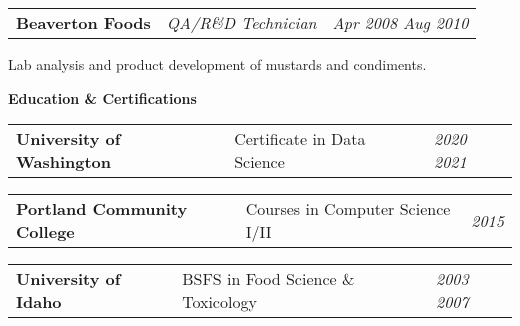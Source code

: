 \documentclass[letterpaper,12pt]{article}[leftmargin=*]
\newcommand{\education}[2]{\vspace{6pt}
  \colorbox{Copper}{\color{white}#1\hspace{9pt}\raggedbottom\normalsize\textbf{#2\hspace{4pt}}}
}
\newcommand{\resumeSectionStart}{\begin{itemize}[leftmargin=0.1in]}
\newcommand{\resumeSectionEnd}{\end{itemize}}
\newcommand{\resumeExperience}[3]{
  \vspace{-6pt}
  \item[]
    \begin{tabularx}{0.97\textwidth}{>{\raggedright}X >{\raggedright\arraybackslash}X >{\raggedleft\arraybackslash}X}
      \textbf{\color{primary}#1} & \textit{\color{accent}#2} & \textit{\color{accent}\small#3} \\
  \end{tabularx}
    
}
\newcommand{\resumeEducation}[3]{
  \vspace{-6pt}
  \item[]
    \begin{tabularx}{0.97\textwidth}[t]{>{\raggedright}X >{\raggedright\arraybackslash}X >{\raggedleft\arraybackslash}X}
      \textbf{\color{primary}#1} & {\small#2} & \textit{\color{accent}\small#3} \\
    \end{tabularx}
}
\begin{document}
\resumeSectionStart{
  \resumeExperience{Beaverton Foods}{QA/R\&D Technician}{Apr 2008 \textemdash{} Aug 2010}
  Lab analysis and product development of mustards and condiments.
}
\vspace{-6pt}
\resumeSectionEnd{}



\education{\faGraduationCap}{Education \& Certifications}

\resumeSectionStart{

  \resumeEducation{University of Washington}{Certificate in Data Science}{2020 \textemdash{} 2021}

  \resumeEducation{Portland Community College}{Courses in Computer Science I/II}{2015}

  \resumeEducation{University of Idaho}{BSFS in Food Science \& Toxicology}{2003 \textemdash{} 2007}

}
\resumeSectionEnd{}
\end{document}

